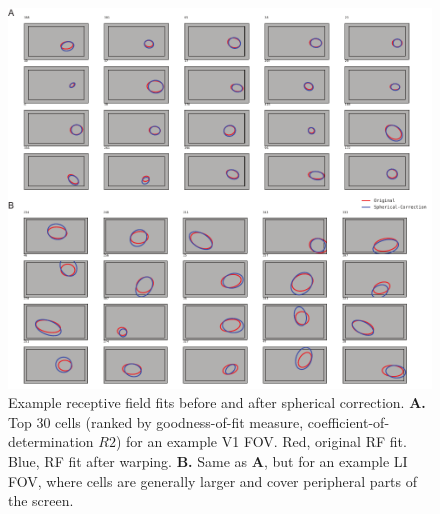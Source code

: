 \begin{figure}[t!]
\includegraphics[width=\textwidth]{figures/supplemental/fig_s9_spherical_correction_examples/fig_s9_spherical_correction_examples.pdf}
    \vspace{.1in}
    \caption[Example RFs after spherical correction]{Example receptive field fits before and after spherical correction.
    \textbf{A.} Top 30 cells (ranked by goodness-of-fit measure, coefficient-of-determination $R2$) for an example V1 FOV. Red, original RF fit. Blue, RF fit after warping. 
    \textbf{B.} Same as \textbf{A}, but for an example LI FOV, where cells are generally larger and cover peripheral parts of the screen.
    \label{supfig:spherical_correction_examples}}
\end{figure}



